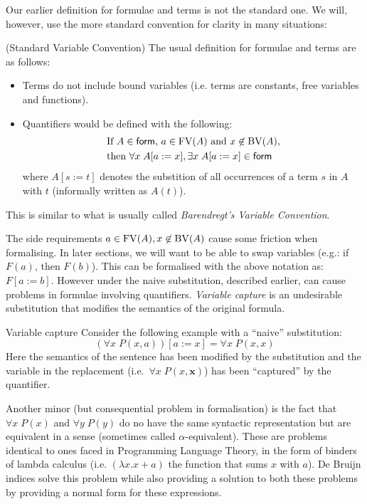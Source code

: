 Our earlier definition for formulae and terms is not the standard one. We will, however, use the more standard convention for clarity in many situations:
\begin{cthremark}{(Standard Variable Convention)}
  The usual definition for formulae and terms are as follows:
  \begin{itemize}[noitemsep]
    \item Terms do not include bound variables (i.e. terms are constants, free variables and functions).
    \item Quantifiers would be defined with the following:
      \begin{align*}
        &\text{If $A \in \textsf{form}$, $a \in \operatorname{FV}(A)$ and $x \not\in \operatorname{BV}(A)$,} \\
        &\text{then $\forall x\; A[a:=x], \exists x\; A[a:=x] \in \textsf{form}$}
      \end{align*}
      where $A[s:=t]$ denotes the substition of all occurrences of a term $s$ in $A$ with $t$ (informally written as $A(t)$).
  \end{itemize}
  This is similar to what is usually called \emph{Barendregt's Variable Convention}.
\end{cthremark}

The side requirements $a \in \operatorname{FV}(A), x \not\in \operatorname{BV}(A)$ cause some friction when formalising. In later sections, we will want to be able to swap variables (e.g.: if $F(a)$, then $F(b)$). This can be formalised with the above notation as: $F[a:=b]$. However under the naive substitution, described earlier, can cause problems in formulae involving quantifiers. \emph{Variable capture} is an undesirable substitution that modifies the semantics of the original formula.

\begin{cthexample}{Variable capture}
Consider the following example with a ``naive'' substitution:
\[ (\forall x\; P(x,a)) [a := x] = \forall x\; P(x, x) \]
Here the semantics of the sentence has been modified by the substitution and the variable in the replacement (i.e.~\(\forall x\; P(x,\mathbf{x})\)) has been ``captured'' by the quantifier.
\end{cthexample}

Another minor (but consequential problem in formalisation) is the fact that \(\forall x \; P(x)\) and \(\forall y\; P(y)\) do no have the same syntactic representation but are equivalent in a sense (sometimes called $\alpha$-equivalent). These are problems identical to ones faced in Programming Language Theory, in the form of binders of lambda calculus (i.e. $(\lambda x. x+a)$ the function that sums $x$ with $a$). De Bruijn indices solve this problem while also providing a solution to both these problems by providing a normal form for these expressions.

